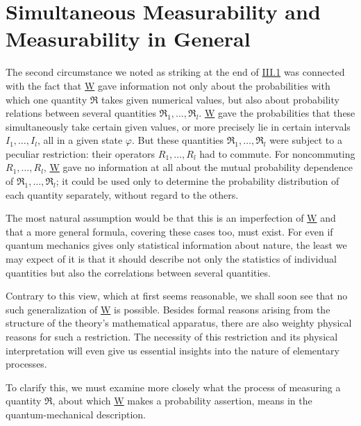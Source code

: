 \documentclass[fontsize=13pt,twoside,openany,headings=normal,parskip=false,bookmarkpackage=false,DIV=calc]{scrbook}
\begin{document}
\hypertarget{origpage-110}{}%
\section{Simultaneous Measurability and Measurability in General}\label{sec:III.3}
The second circumstance we noted as striking at the end of \hyperref[sec:III.1]{III.1} was connected with the fact that \hyperref[post:III.1.W]{W} gave information not only about the probabilities with which one quantity $\mathfrak R$ takes given numerical values, but also about probability relations between several quantities $\mathfrak R_1,\ldots,\mathfrak R_l$. \hyperref[post:III.1.W]{W} gave the probabilities that these simultaneously take certain given values, or more precisely lie in certain intervals $I_1,\ldots,I_l$, all in a given state $\varphi$. But these quantities $\mathfrak R_1,\ldots,\mathfrak R_l$ were subject to a peculiar restriction: their operators $R_1,\ldots,R_l$ had to commute. For noncommuting $R_1,\ldots,R_l$, \hyperref[post:III.1.W]{W} gave no information at all about the mutual probability dependence of $\mathfrak R_1,\ldots,\mathfrak R_l$; it could be used only to determine the probability distribution of each quantity separately, without regard to the others.

The most natural assumption would be that this is an imperfection of \hyperref[post:III.1.W]{W} and that a more general formula, covering these cases too, must exist. For even if quantum mechanics gives only statistical information about nature, the least we may expect of it is that it should describe not only the statistics of individual quantities but also the correlations between several quantities.

Contrary to this view, which at first seems reasonable, we shall soon see that no such generalization of \hyperref[post:III.1.W]{W} is possible. Besides formal reasons arising from the structure of the theory's mathematical apparatus, there are also weighty physical reasons for such a restriction. The necessity of this restriction and its physical interpretation will even give us essential insights into the nature of elementary processes.

To clarify this, we must examine more closely what the process of measuring a quantity $\mathfrak R$, about which \hyperref[post:III.1.W]{W} makes a probability assertion, means in the quantum-mechanical description.
\end{document}

